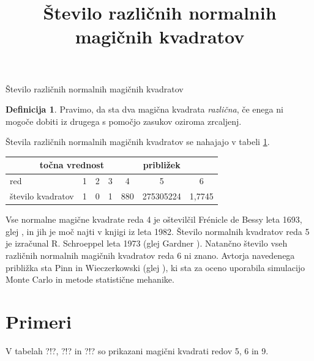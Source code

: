 \documentclass[a4paper,12pt]{article}
\theoremstyle{plain}
\theoremstyle{definition}
\newtheorem{definicija}[izrek]{Definicija}
\newcommand{\pojem}[1]{\emph{\color{purple}#1}}
\begin{document}
Število različnih normalnih magičnih kvadratov

\begin{definicija}
      Pravimo, da sta dva magična kvadrata \pojem{različna}, če enega ni mogoče dobiti
      iz drugega s pomočjo zasukov oziroma zrcaljenj.
\end{definicija}

Števila različnih normalnih magičnih kvadratov se nahajajo v tabeli \ref{table:stevila}.

      
      
\begin{table}
   \centering
   \title{Število različnih normalnih magičnih kvadratov}
   \label{table:stevila}
   \begin{tabular}{lcccccc}\toprule
      \multicolumn{5}{c}{točna vrednost} & približek \\
      \midrule
      red & 1 & 2 & 3 & 4 & 5 & 6 \\
      število kvadratov & 1 & 0 & 1 & 880 & 275305224 & 1,7745 \\
      \bottomrule
   \end{tabular}
\end{table}


Vse normalne magične kvadrate reda 4 je oštevilčil Frénicle de Bessy
leta 1693, glej \cite{bessy}, in jih je moč najti v knjigi \cite{berlekamp}
iz leta 1982. Število normalnih kvadratov reda 5 je izračunal
R. Schroeppel leta 1973 (glej Gardner \cite{gardner}).
Natančno število vseh različnih normalnih magičnih kvadratov reda 6 ni znano.
Avtorja navedenega približka sta Pinn in Wieczerkowski (glej \cite{pinn}), ki
sta za oceno uporabila simulacijo Monte Carlo in metode statistične mehanike.


\section{Primeri}

V tabelah ?!?, ?!? in ?!? so prikazani
magični kvadrati redov 5, 6 in 9.

\end{document}
